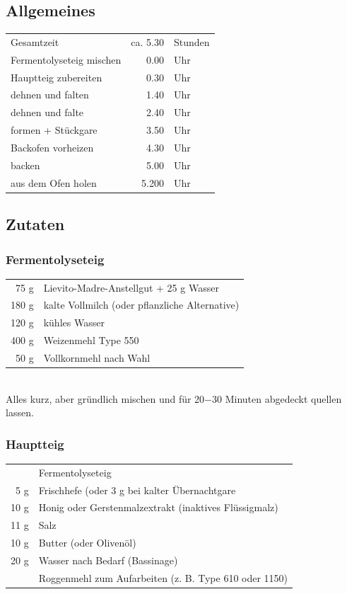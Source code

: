 \documentclass[10pt,a4paper,ngerman, DIV=16]{scrartcl}
\begin{document}
\subsection*{Allgemeines}
\begin{tabular}{lrl}
    Gesamtzeit          &   ca. 5.30 & Stunden \\
    Fermentolyseteig mischen   &   0.00        & Uhr \\
    Hauptteig zubereiten   &   0.30        & Uhr \\
    dehnen und falten   &   1.40        & Uhr \\
    dehnen und falte   &   2.40        & Uhr \\
    formen + Stückgare  &  3.50         & Uhr \\
    Backofen vorheizen &   4.30        & Uhr \\
    backen &   5.00        & Uhr \\
    aus dem Ofen holen  &   5.200        & Uhr \\
\end{tabular}

\subsection*{Zutaten}
\subsubsection*{Fermentolyseteig}
\begin{tabular}{r l}
    75 g & Lievito-Madre-Anstellgut + 25 g Wasser\\
    180 g & kalte Vollmilch (oder pflanzliche Alternative)\\
    120 g & kühles Wasser\\
    400 g & Weizenmehl Type 550\\
    50 g & Vollkornmehl nach Wahl\\
\end{tabular}\\
Alles kurz, aber gründlich mischen und für 20−30 Minuten abgedeckt quellen lassen.


\subsubsection*{Hauptteig}
\begin{tabular}{r l}
    & Fermentolyseteig                                      \\
    5 g & Frischhefe (oder 3 g bei kalter Übernachtgare         \\
    10 g & Honig oder Gerstenmalzextrakt (inaktives Flüssigmalz) \\
    11 g & Salz                                                  \\
    10 g & Butter (oder Olivenöl)                                \\
    20 g & Wasser nach Bedarf (Bassinage)                        \\
    & Roggenmehl zum Aufarbeiten (z. B. Type 610 oder 1150)
\end{tabular}\\
\end{document}
